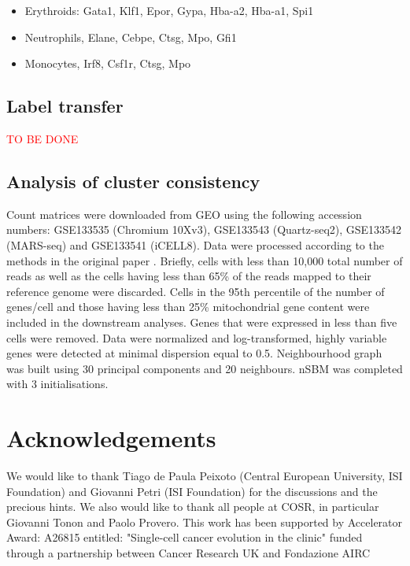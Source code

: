 \documentclass[10pt]{article}
\begin{document}
\begin{itemize}
\item Erythroids: Gata1, Klf1, Epor, Gypa, Hba-a2, Hba-a1, Spi1
\item Neutrophils, Elane, Cebpe, Ctsg, Mpo, Gfi1
\item Monocytes, Irf8, Csf1r, Ctsg, Mpo
\end{itemize}

\subsection*{Label transfer}
\textcolor{red}{TO BE DONE}

\subsection*{Analysis of cluster consistency}

Count matrices were downloaded from GEO using the following accession numbers: GSE133535 (Chromium 10Xv3), GSE133543 (Quartz-seq2), GSE133542 (MARS-seq) and GSE133541 (iCELL8). Data were processed according to the methods in the original paper \cite{mereu_2020}. Briefly, cells with less than 10,000 total number of reads as well as the cells having less than 65\% of the reads mapped to their reference genome were discarded. Cells in the 95th percentile of the number of genes/cell and those having less than 25\% mitochondrial gene content were included in the downstream analyses. Genes that were expressed in less than five cells were removed. Data were normalized and log-transformed, highly variable genes were detected at minimal dispersion equal to 0.5. Neighbourhood graph was built using 30 principal components and 20 neighbours. nSBM was completed with 3 initialisations. 


\section*{Acknowledgements}

We would like to thank Tiago de Paula Peixoto (Central European University, ISI Foundation) and Giovanni Petri (ISI Foundation) for the discussions and the precious hints. We also would like to thank all people at COSR, in particular Giovanni Tonon and Paolo Provero.
This work has been supported by Accelerator Award: A26815 entitled:  "Single-cell cancer evolution in the clinic" funded through a partnership between Cancer Research UK and Fondazione AIRC





\end{document}
